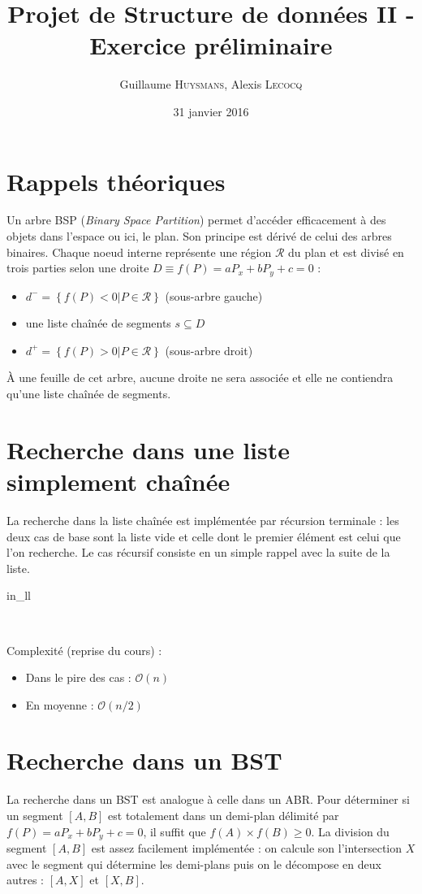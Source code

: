\documentclass[12pt,twocolumn]{article}
\title{Projet de Structure de données II - Exercice préliminaire}
\author{Guillaume \textsc{Huysmans}, Alexis \textsc{Lecocq}}
\date{31 janvier 2016}
\newcommand{\es}{\emptyset}
\newcommand{\inc}{\subseteq}
\newcommand{\bigO}{\mathcal{O}}
\newcommand{\reg}{\mathcal{R}}
\begin{document}
\maketitle

\section{Rappels théoriques}
Un arbre BSP (\textit{Binary Space Partition}) permet d'accéder efficacement
à des objets dans l'espace ou ici, le plan. Son principe est dérivé de celui
des arbres binaires. Chaque noeud interne représente une région $\reg$
du plan et est divisé en trois parties selon
une droite $D\equiv f(P)=aP_x+bP_y+c=0$ :
\begin{itemize}
	\item $d^-=\left\{f(P)<0|P\in\reg\right\}$ (sous-arbre gauche)
	\item une liste chaînée de segments $s \inc D$
	\item $d^+=\left\{f(P)>0|P\in\reg\right\}$ (sous-arbre droit)
\end{itemize}
À une feuille de cet arbre, aucune droite ne sera associée et elle ne
contiendra qu'une liste chaînée de segments.

\section{Recherche dans une liste simplement chaînée}
La recherche dans la liste chaînée est implémentée par récursion terminale :
les deux cas de base sont la liste vide et celle dont le premier élément
est celui que l'on recherche. Le cas récursif consiste en un simple rappel
avec la suite de la liste.

\begin{algorithm}
\caption{in\_ll}
\SetAlgoLined\DontPrintSemicolon
{}
\uIf{ll = $\es$} {
}
 {
}
~
\end{algorithm}

Complexité (reprise du cours) :
\begin{itemize}
	\item Dans le pire des cas : $\bigO(n)$
	\item En moyenne : $\bigO(n/2)$
\end{itemize}

\section{Recherche dans un BST}
La recherche dans un BST est analogue à celle dans un ABR.
Pour déterminer si un segment $[A,B]$ est totalement dans un demi-plan
délimité par $f(P)=aP_x+bP_y+c=0$, il suffit que $f(A) \times f(B) \geq 0$.
La division du segment $[A,B]$ est assez facilement implémentée :
on calcule son l'intersection $X$ avec le segment qui détermine
les demi-plans puis on le décompose en deux autres : $[A,X]$ et $[X,B]$.
\end{document}
